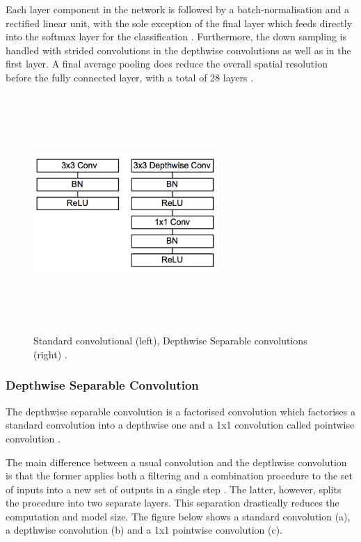 Each layer component in the network is followed by a batch-normalisation and a rectified linear unit, with the sole exception of the final layer which feeds directly into the softmax layer for the classification \cite{paper:MobileNets}. Furthermore, the down sampling is handled with strided convolutions in the depthwise convolutions as well as in the first layer. A final average pooling does reduce the overall spatial resolution before the fully connected layer, with a total of 28 layers \cite{paper:MobileNets}.

\begin{figure}[!htbp]
\begin{center}
\includegraphics[width=7cm,height=9cm,keepaspectratio]{images/mobileNet_contrast.png}
\end{center}
\caption{Standard convolutional (left), Depthwise Separable convolutions (right) \cite{paper:MobileNets}.}
\end{figure}

\subsubsection{Depthwise Separable Convolution}

The depthwise separable convolution is a factorised convolution which factorises a standard convolution into a depthwise one and a 1x1 convolution called pointwise convolution \cite{paper:MobileNets}.

The main difference between a usual convolution and the depthwise convolution is that the former applies both a filtering and a combination procedure to the set of inputs into a new set of outputs in a single step \cite{paper:MobileNets}. The latter, however, splits the procedure into two separate layers. This separation drastically reduces the computation and model size. The figure below shows a standard convolution (a), a depthwise convolution (b) and a 1x1 pointwise convolution (c).

